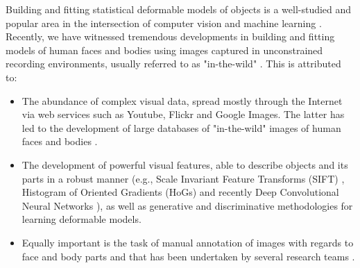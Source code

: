 Building and fitting statistical deformable models of objects is a well-studied and popular area in the intersection of computer vision and machine learning \cite{Cootes1995, Cootes2001, Matthews2004, Saragih2011, Belhumeur2011, Zhu2012, Xiong2013}. Recently, we have witnessed tremendous developments in building and fitting models of human faces and bodies using images captured in unconstrained recording environments, usually referred to as "in-the-wild" \cite{Belhumeur2011, Cao2012, Zhu2012, Xiong2013, Asthana2013, Tzimiropoulos2014, Asthana2014}. This is attributed to:
\begin{itemize}


\item The abundance of complex visual data, spread mostly through the Internet via web services such as Youtube, Flickr and Google Images. The latter has led to the development of large databases of "in-the-wild" images of human faces and bodies \cite{Belhumeur2011, Le2012, Zhu2012, Burgos2013}.

\item The development of powerful visual features, able to describe objects and its parts in a robust manner (e.g., Scale Invariant Feature Transforms (SIFT) \cite{lowe1999object}, Histogram of Oriented Gradients (HoGs) \cite{Dalal2005} and recently Deep Convolutional Neural Networks \cite{sermanet2013overfeat}), as well as generative and discriminative methodologies for learning deformable models.

\item Equally important is the task of manual annotation of images with regards to face and body parts and that has been undertaken by several research teams \cite{sagonas_iccv_300w_2013,charles2013domain,dantone2014body,andriluka14cvpr}.

\end{itemize}

